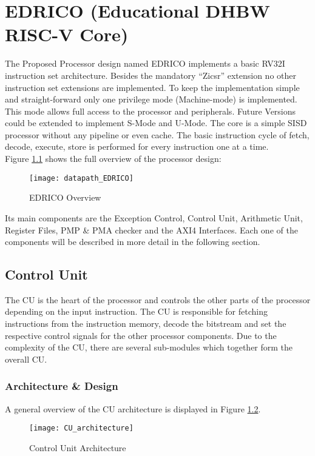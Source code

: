 
\chapter{EDRICO (Educational DHBW RISC-V Core)}

The Proposed Processor design named EDRICO implements a basic RV32I
instruction set architecture. Besides the mandatory “Zicsr” extension no other
instruction set extensions are implemented. To keep the implementation simple and
straight-forward only one privilege mode (Machine-mode) is implemented. This mode
allows full access to the processor and peripherals. Future Versions could be
extended to implement S-Mode and U-Mode.
The core is a simple \acf{SISD} processor without any pipeline or even cache. The basic
instruction cycle of fetch, decode, execute, store is performed for every instruction
one at a time.\\
Figure \ref{fig:edricooverview} shows the full overview of the processor design:

\begin{figure}[H]
	\centering
	\texttt{[image: datapath\_EDRICO]}
	\caption{EDRICO Overview}
	\label{fig:edricooverview}
\end{figure}

Its main components are the Exception Control, Control Unit, Arithmetic Unit,
Register Files, PMP \& PMA checker and the AXI4 Interfaces.
Each one of the components will be described in more detail in the following section.

\section{Control Unit}
The \ac{CU} is the heart of the processor and controls the other parts of the processor depending on the input instruction. The CU is responsible for fetching instructions from the instruction memory, decode the bitstream and set the respective control signals for the other processor components. Due to the complexity of the CU, there are several sub-modules which together form the overall CU.
\subsection{Architecture \& Design}
\label{CU_arch}
A general overview of the CU architecture is displayed in Figure \ref{fig:cuarchitecture}. 

\begin{figure}[H]
	\centering
	\texttt{[image: CU\_architecture]}
	\caption{Control Unit Architecture}
	\label{fig:cuarchitecture}
\end{figure}

